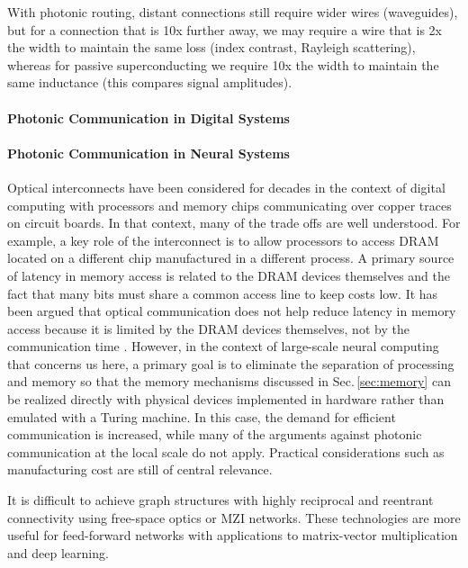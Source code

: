 \vspace{3em}
With photonic routing, distant connections still require wider wires (waveguides), but for a connection that is 10x further away, we may require a wire that is 2x the width to maintain the same loss (index contrast, Rayleigh scattering), whereas for passive superconducting we require 10x the width to maintain the same inductance (this compares signal amplitudes).

\paragraph{Photonic Communication in Digital Systems}

\paragraph{Photonic Communication in Neural Systems}

\vspace{3em}
Optical interconnects have been considered for decades in the context of digital computing with processors and memory chips communicating over copper traces on circuit boards. In that context, many of the trade offs are well understood. For example, a key role of the interconnect is to allow processors to access DRAM located on a different chip manufactured in a different process. A primary source of latency in memory access is related to the DRAM devices themselves and the fact that many bits must share a common access line to keep costs low. It has been argued that optical communication does not help reduce latency in memory access because it is limited by the DRAM devices themselves, not by the communication time \cite{husz2003}. However, in the context of large-scale neural computing that concerns us here, a primary goal is to eliminate the separation of processing and memory so that the memory mechanisms discussed in Sec.\,\ref{sec:memory} can be realized directly with physical devices implemented in hardware rather than emulated with a Turing machine. In this case, the demand for efficient communication is increased, while many of the arguments against photonic communication at the local scale do not apply. Practical considerations such as manufacturing cost are still of central relevance.

\vspace{3em}
It is difficult to achieve graph structures with highly reciprocal and reentrant connectivity using free-space optics or MZI networks. These technologies are more useful for feed-forward networks with applications to matrix-vector multiplication and deep learning.
 

